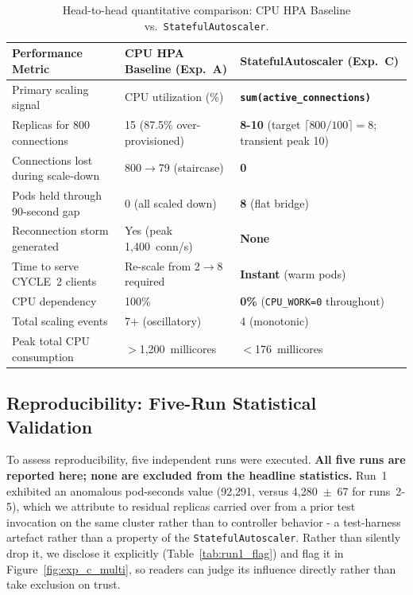 \documentclass[3p,twocolumn]{elsarticle}
\theoremstyle{plain}%
\theoremstyle{definition}%
\begin{document}
\begin{table}[!tp]
\centering
\caption{Head-to-head quantitative comparison: CPU HPA Baseline vs.\ \texttt{StatefulAutoscaler}.}
\label{tab:head_to_head}
\small
\begin{tabular}{@{}p{4.5cm}p{4.5cm}p{4.5cm}@{}}
\toprule
\rowcolor{gray!12}
\textbf{Performance Metric} & \textbf{CPU HPA Baseline (Exp.~A)} & \textbf{StatefulAutoscaler (Exp.~C)} \\
\midrule
Primary scaling signal & CPU utilization (\%) & \textbf{\texttt{sum(active\_connections)}} \\
Replicas for 800 connections & 15 (87.5\% over-provisioned) & \textbf{8-10} (target $\lceil800/100\rceil=8$; transient peak 10) \\
Connections lost during scale-down & 800$\rightarrow$79 (staircase) & \textbf{0} \\
Pods held through 90-second gap & 0 (all scaled down) & \textbf{8} (flat bridge) \\
Reconnection storm generated & Yes (peak 1,400~conn/s) & \textbf{None} \\
Time to serve CYCLE~2 clients & Re-scale from 2$\rightarrow$8 required & \textbf{Instant} (warm pods) \\
CPU dependency & 100\% & \textbf{0\%} (\texttt{CPU\_WORK=0} throughout) \\
Total scaling events & 7+ (oscillatory) & 4 (monotonic) \\
Peak total CPU consumption & $>$1,200~millicores & $<$176~millicores \\
\bottomrule
\end{tabular}
\end{table}

\subsection{Reproducibility: Five-Run Statistical Validation}
\label{sec:exp_c_multi}

To assess reproducibility, five independent runs were executed. \textbf{All five runs are reported here; none are excluded from the headline statistics.} Run~1 exhibited an anomalous pod-seconds value (92{,}291, versus 4{,}280~$\pm$~67 for runs~2-5), which we attribute to residual replicas carried over from a prior test invocation on the same cluster rather than to controller behavior - a test-harness artefact rather than a property of the \texttt{StatefulAutoscaler}. Rather than silently drop it, we disclose it explicitly (Table~\ref{tab:run1_flag}) and flag it in Figure~\ref{fig:exp_c_multi}, so readers can judge its influence directly rather than take exclusion on trust.
\end{document}
